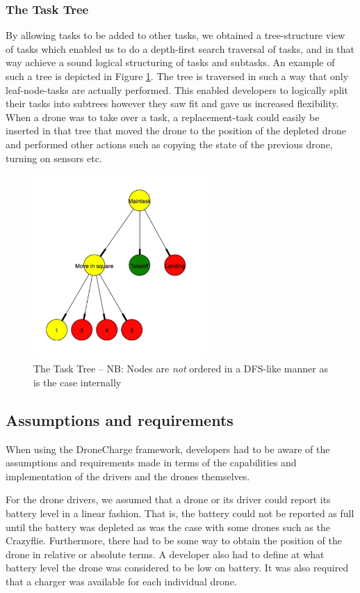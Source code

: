 \subsubsection{The Task Tree}
By allowing tasks to be added to other tasks, we obtained a tree-structure view of tasks which enabled us to do a depth-first search traversal of tasks, and in that way achieve a sound logical structuring of tasks and subtasks. An example of such a tree is depicted in Figure \ref{fig:tasktree}. The tree is traversed in such a way that only leaf-node-tasks are actually performed. This enabled developers to logically split their tasks into subtrees however they saw fit and gave us increased flexibility. When a drone was to take over a task, a replacement-task could easily be inserted in that tree that moved the drone to the position of the depleted drone and performed other actions such as copying the state of the previous drone, turning on sensors etc.

\begin{figure}[h]
\begin{center}
\includegraphics[height=7cm]{images/task-graph.png}%
\caption{The Task Tree -- NB: Nodes are \textit{not} ordered in a DFS-like manner as is the case internally}
\label{fig:tasktree}
\end{center}
\end{figure}

\subsection{Assumptions and requirements}
When using the DroneCharge framework, developers had to be aware of the assumptions and requirements made in terms of the capabilities and implementation of the drivers and the drones themselves.

For the drone drivers, we assumed that a drone or its driver could report its battery level in a linear fashion. That is, the battery could not be reported as full until the battery was depleted as was the case with some drones such as the Crazyflie. Furthermore, there had to be some way to obtain the position of the drone in relative or absolute terms. A developer also had to define at what battery level the drone was considered to be low on battery. It was also required that a charger was available for each individual drone.

